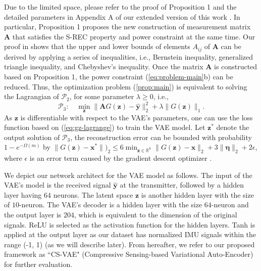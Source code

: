 \documentclass[conference, 10pt]{IEEEtran}
\begin{document}
Due to the limited space, please refer to the proof of Proposition 1 and the detailed parameters in Appendix A of our extended version of this work \cite{hieu2024reconstructing}. In particular, Proposition 1 proposes the new construction of measurement matrix $\mathbf{A}$ that satisfies the S-REC property and power constraint at the same time. Our proof in \cite{hieu2024reconstructing} shows that the upper and lower bounds of elements $A_{ij}$ of $\mathbf{A}$ can be derived by applying a series of inequalities, i.e., Bernstein inequality, generalized triangle inequality, and Chebyshev's inequality.
Once the matrix $\mathbf{A}$ is constructed based on Proposition 1, the power constraint (\ref{eq:problem-main}b) can be reduced. Thus, the optimization problem (\ref{prop:main}) is equivalent to solving the Lagrangian of $\mathcal{P}_2$, for some parameter $\lambda \geq 0$, i.e.,
\begin{equation}
\label{eq:gz-lagrange}
\mathcal{P}_3: \quad \min_{\mathbf{z}} \|\mathbf{A}G(\mathbf{z}) - \mathbf{\hat{y}}\|_2^2 + \lambda \|G(\mathbf{z})\|_1.
\end{equation}
As $\mathbf{z}$ is differentiable with respect to the VAE's parameters, one can use the loss function based on (\ref{eq:gz-lagrange}) to train the VAE model. Let $\mathbf{z}^*$ denote the output solution of $\mathcal{P}_3$, the reconstruction error can be bounded with probability $1 - e^{-\Omega(m)}$ by  $\|G(\mathbf{z}) - \mathbf{x}^*\|)_2 \leq 6 \min_{\mathbf{z} \in \mathbb{R}^k} \|G(\mathbf{z}) - \mathbf{x}\|_2 + 3 \|\bm{\eta}\|_2 + 2 \epsilon$,
where $\epsilon$ is an error term caused by the gradient descent optimizer \cite{bora2017compressed}. 


We depict our network architect for the VAE model as follows. The input of the VAE's model is the received signal $\mathbf{\hat{y}}$ at the transmitter, followed by a hidden layer having $64$ neurons. The latent space $\mathbf{z}$ is another hidden layer with the size of $10$-neuron.  The VAE's decoder is a hidden layer with the size $64$-neuron and the output layer is $204$, which is equivalent to the dimension of the original signals. ReLU is selected as the activation function for the hidden layers. Tanh is applied at the output layer as our dataset has normalized IMU signals within the range (-1, 1) (as we will describe later). From hereafter, we refer to our proposed framework as ``CS-VAE" (Compressive Sensing-based Variational Auto-Encoder) for further evaluation.
\end{document}
